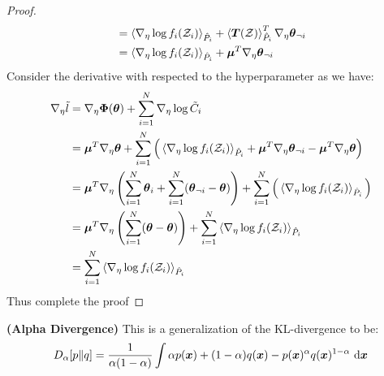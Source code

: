 \begin{proof}
\begin{equation*}
\begin{aligned}
        &= \left\langle \nabla_\eta \log f_i(\mathcal{Z}_i) \right\rangle_{\hat{P}_i} + \left\langle \boldsymbol T(\mathcal{Z}) \right\rangle^T_{\hat{P}_i}\nabla_\eta \boldsymbol \theta_{\neg i} \\
        &= \left\langle \nabla_\eta \log f_i(\mathcal{Z}_i) \right\rangle_{\hat{P}_i} + \boldsymbol \mu^T \nabla_\eta \boldsymbol \theta_{\neg i} \\
    \end{aligned}
    \end{equation*}
    Consider the derivative with respected to the hyperparameter as we have:
    \begin{equation*}
    \begin{aligned}
        \nabla_\eta \tilde{l} &= \nabla_\eta \boldsymbol \Phi(\boldsymbol \theta) + \sum^N_{i=1}\nabla_\eta \log \tilde{C}_i \\
        &= \boldsymbol\mu^T\nabla_\eta \boldsymbol \theta + \sum^N_{i=1}\Big( \left\langle \nabla_\eta \log f_i(\mathcal{Z}_i) \right\rangle_{\hat{P}_i} + \boldsymbol \mu^T\nabla_\eta \boldsymbol \theta_{\neg i} - \boldsymbol\mu^T\nabla_\eta\boldsymbol\theta \Big)  \\
        &= \boldsymbol\mu^T\nabla_\eta\left(  \sum^N_{i=1}\boldsymbol \theta_i + \sum^N_{i=1}(\boldsymbol \theta_{\neg i} - \boldsymbol \theta) \right) + \sum^N_{i=1}\Big( \left\langle \nabla_\eta \log f_i(\mathcal{Z}_i) \right\rangle_{\hat{P}_i}\Big)  \\
        &= \boldsymbol\mu^T\nabla_\eta\left( \sum^N_{i=1}(\boldsymbol \theta - \boldsymbol \theta) \right) + \sum^N_{i=1}\left\langle \nabla_\eta \log f_i(\mathcal{Z}_i) \right\rangle_{\hat{P}_i}  \\
        &=\sum^N_{i=1}\left\langle \nabla_\eta \log f_i(\mathcal{Z}_i) \right\rangle_{\hat{P}_i}  \\
    \end{aligned}
    \end{equation*}
    Thus complete the proof
\end{proof}

\begin{definition}{\textbf{(Alpha Divergence)}}
    This is a generalization of the KL-divergence to be:
    \begin{equation*}
        D_\alpha[p \| q] = \frac{1}{\alpha(1-\alpha)} \int \alpha p(\boldsymbol x) + (1-\alpha)q(\boldsymbol x) - p(\boldsymbol x)^\alpha q(\boldsymbol x)^{1-\alpha}\ \mathrm{d} \boldsymbol x
    \end{equation*} 
\end{definition}

